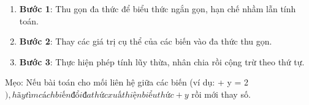 \begin{enumerate}
\item \textbf{Bước 1}: Thu gọn đa thức để biểu thức ngắn gọn, hạn chế nhầm lẫn tính toán.
\item \textbf{Bước 2}: Thay các giá trị cụ thể của các biến vào đa thức thu gọn.
\item \textbf{Bước 3}: Thực hiện phép tính lũy thừa, nhân chia rồi cộng trừ theo thứ tự.
\end{enumerate}
Mẹo: Nếu bài toán cho mối liên hệ giữa các biến (ví dụ:  + y = 2$), hãy tìm cách biến đổi đa thức xuất hiện biểu thức +y$ rồi mới thay số.
